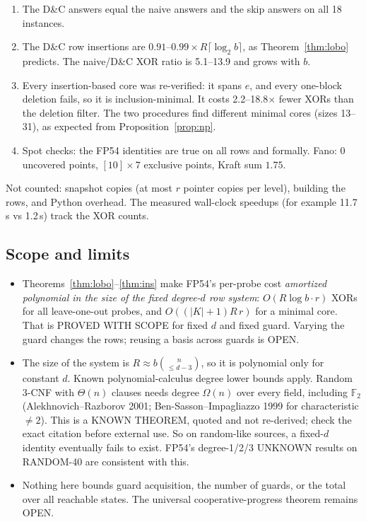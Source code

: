 \documentclass[11pt]{article}
\theoremstyle{definition}
\newcommand{\F}{\mathbb{F}_2}
\begin{document}
\begin{enumerate}
\item The D\&C answers equal the naive answers and the skip answers on all 18 instances.
\item The D\&C row insertions are $0.91$--$0.99\times R\lceil\log_2 b\rceil$, as Theorem~\ref{thm:lobo} predicts. The naive/D\&C XOR ratio is 5.1--13.9 and grows with $b$.
\item Every insertion-based core was re-verified: it spans $e$, and every one-block deletion fails, so it is inclusion-minimal. It costs 2.2--18.8$\times$ fewer XORs than the deletion filter. The two procedures find different minimal cores (sizes 13--31), as expected from Proposition~\ref{prop:np}.
\item Spot checks: the FP54 identities are true on all rows and formally. Fano: 0 uncovered points, $[10]\times7$ exclusive points, Kraft sum $1.75$.
\end{enumerate}
Not counted: snapshot copies (at most $r$ pointer copies per level), building the rows, and Python overhead. The measured wall-clock speedups (for example 11.7\,s vs 1.2\,s) track the XOR counts.

\subsection{Scope and limits}\label{sec:limits}
\begin{itemize}
\item Theorems~\ref{thm:lobo}--\ref{thm:ins} make FP54's per-probe cost \emph{amortized polynomial in the size of the fixed degree-$d$ row system}: $O(R\log b\cdot r)$ XORs for all leave-one-out probes, and $O((|K|+1)R\,r)$ for a minimal core. That is PROVED WITH SCOPE for fixed $d$ and fixed guard. Varying the guard changes the rows; reusing a basis across guards is OPEN.
\item The size of the system is $R\approx b\binom{n}{\le d-3}$, so it is polynomial only for constant $d$. Known polynomial-calculus degree lower bounds apply. Random 3-CNF with $\Theta(n)$ clauses needs degree $\Omega(n)$ over every field, including $\F$ (Alekhnovich--Razborov 2001; Ben-Sasson--Impagliazzo 1999 for characteristic $\neq2$). This is a KNOWN THEOREM, quoted and not re-derived; check the exact citation before external use. So on random-like sources, a fixed-$d$ identity eventually fails to exist. FP54's degree-1/2/3 UNKNOWN results on RANDOM-40 are consistent with this.
\item Nothing here bounds guard acquisition, the number of guards, or the total over all reachable states. The universal cooperative-progress theorem remains OPEN.
\end{itemize}
\end{document}
